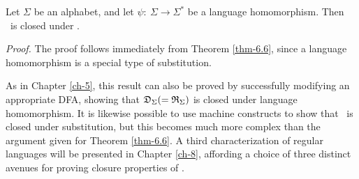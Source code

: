 \begin{cor}\label{cor-6.3}
Let $\Sigma$ be an alphabet, and let $\psi:\ \Sigma \rightarrow \Sigma^*$ be a
language homomorphism. Then \RSIG\ is closed under \PBAR.

\emph{Proof.} The proof follows immediately from Theorem \ref{thm-6.6}, since a language
homomorphism is a special type of substitution.
\end{cor}

As in Chapter \ref{ch-5}, this result can also be proved by successfully modifying an
appropriate DFA, showing that $\mathfrak{D}_\Sigma ( = \mathfrak{R}_\Sigma)$ is closed under language
homomorphism. It is likewise possible to use machine constructs to show that
\DSIG\ is closed under substitution, but this becomes much more complex than the
argument given for Theorem \ref{thm-6.6}. A third characterization of regular languages
will be presented in Chapter \ref{ch-8}, affording a choice of three distinct avenues for
proving closure properties of \RSIG.

